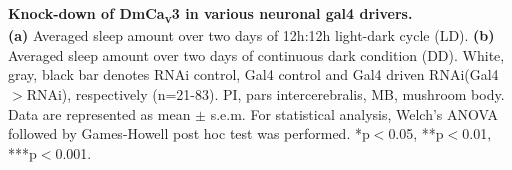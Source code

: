 \label{fig:S4}
\textbf{Knock-down of DmCa\textsubscript{v}3 in various neuronal gal4 drivers.}
\\
\textbf {(a)} Averaged sleep amount over two days of 12h:12h light-dark cycle (LD).
\textbf {(b)} Averaged sleep amount over two days of continuous dark condition (DD).
White, gray, black bar denotes RNAi control, Gal4 control and Gal4 driven RNAi(Gal4$>$RNAi), respectively (n=21-83).
PI, pars intercerebralis, MB, mushroom body. 
Data are represented as mean $\pm$ s.e.m.
For statistical analysis, Welch's ANOVA followed by Games-Howell post hoc test was performed.
*p$<$0.05, **p$<$0.01, ***p$<$0.001.
  
  